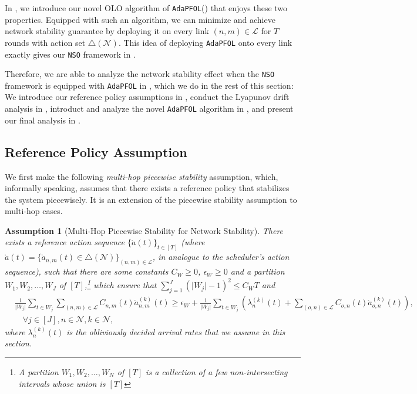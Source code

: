 \documentclass[11pt,fullpage,letterpaper]{article} %
\newtheorem{assumption}{Assumption}
\renewcommand{\bm}[1]{#1}%
\newcommand{\mN}{{\mathcal N}}
\newcommand{\mL}{{\mathcal L}}
\newcommand{\SSAlg}{\texttt{NSO}\xspace}
\newcommand{\OLOAlg}{\texttt{AdaPFOL}\xspace}
\begin{document}
In , we introduce our novel OLO algorithm of \OLOAlg () that enjoys these two properties.
Equipped with such an algorithm, we can minimize  and achieve network stability guarantee by deploying it on every link $(n,m)\in \mL$ for $T$ rounds with action set $\triangle(\mN)$. This idea of deploying \OLOAlg onto every link exactly gives our \SSAlg framework in .

Therefore, we are able to analyze the network stability effect when the \SSAlg framework is equipped with \OLOAlg in , which we do in the rest of this section:
We introduce our reference policy assumptions in , conduct the Lyapunov drift analysis in , introduct and analyze the novel \OLOAlg algorithm in , and present our final analysis in .

\subsection{Reference Policy Assumption}\label{sec:multi-hop stability assumption}
We first make the following \textit{multi-hop piecewise stability} assumption, which, informally speaking, assumes that there exists a reference policy that stabilizes the system piecewisely.
It is an extension of the piecewise stability assumption \citep[Assumption 1]{huang2023queue} to multi-hop cases.
\begin{assumption}[Multi-Hop Piecewise Stability for Network Stability]\label{def:multi-hop stability network stability}
There exists a reference action sequence $\{\mathring{\bm a}(t)\}_{t\in [T]}$ (where $\mathring{\bm a}(t)=\{\mathring{\bm a}_{n,m}(t)\in \triangle(\mN)\}_{(n,m)\in \mL}$, in analogue to the scheduler's action sequence), such that
there are some constants $C_W\ge 0$, $\epsilon_W\ge 0$ and a partition $W_1,W_2,\ldots,W_J$ of $[T]$,\footnote{A partition $W_1,W_2,\ldots,W_N$ of $[T]$ is a collection of a few non-intersecting intervals whose union is $[T]$} which ensure that $\sum_{j=1}^J (\lvert W_j\rvert-1)^2\le C_W T$ and
\begin{align}
&\frac{1}{\lvert W_j\rvert} \sum_{t\in W_j} \sum_{(n,m)\in \mL} C_{n,m}(t) \mathring a_{n,m}^{(k)}(t) \ge \epsilon_W + \frac{1}{\lvert W_j\rvert} \sum_{t\in W_j} \left (\lambda_n^{(k)}(t) + \sum_{(o,n)\in \mL} C_{o,n}(t) \mathring a_{o,n}^{(k)}(t)\right ), \nonumber\\
&\quad \forall j\in [J],n\in \mN,k\in \mN,\label{eq:multi-hop stability network stability}
\end{align}
where $\lambda_n^{(k)}(t)$ is the obliviously decided arrival rates that we assume in this section.
\end{assumption}
\end{document}
